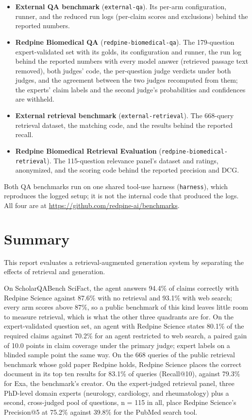 \documentclass[sn-mathphys,Numbered]{sn-jnl}%
\begin{document}
\begin{itemize}[leftmargin=1.6em, itemsep=0.5em]
  \item \textbf{External QA benchmark} (\texttt{external-qa}). Its per-arm configuration,
    runner, and the reduced run logs (per-claim scores and exclusions) behind the reported
    numbers.
  \item \textbf{Redpine Biomedical QA} (\texttt{redpine-biomedical-qa}). The 179-question
    expert-validated set with its golds, its configuration and runner, the run log behind
    the reported numbers with every model answer
    (retrieved passage text removed), both judges' code, the per-question judge verdicts
    under both judges, and the agreement between the two judges recomputed from them; the
    experts' claim labels and the second judge's probabilities and confidences are withheld.
  \item \textbf{External retrieval benchmark} (\texttt{external-retrieval}). The
    668-query retrieval dataset, the matching code, and the results behind the reported
    recall.
  \item {\raggedright\textbf{Redpine Biomedical Retrieval Evaluation}
    (\texttt{redpine-biomedical-retrieval}). The 115-question relevance panel's dataset and
    ratings, anonymized, and the scoring code behind the reported precision and DCG.\par}
\end{itemize}

\noindent Both QA benchmarks run on one shared tool-use harness (\texttt{harness}), which
reproduces the logged setup; it is not the internal code that produced the logs.
All four are at \url{https://github.com/redpine-ai/benchmarks}.

\section{Summary}\label{sec:summary}

This report evaluates a retrieval-augmented generation system by separating the
effects of retrieval and generation.

On ScholarQABench SciFact, the agent answers 94.4\% of claims correctly with Redpine
Science against 87.6\% with no retrieval and 93.1\% with web search; every arm scores
above 87\%, so a public benchmark of this kind leaves little room to measure retrieval,
which is what the other three quadrants are for. On the expert-validated question set,
an agent with Redpine Science states 80.1\% of the required claims against 70.2\% for
an agent restricted to web search, a paired gain of 10.0 points in claim coverage under
the primary judge; expert labels on a blinded sample point the same way. On the 668
queries of the public retrieval benchmark whose gold paper Redpine holds, Redpine
Science places the correct document in its top ten results for 83.1\% of queries
(Recall@10), against 79.3\% for Exa, the benchmark's creator. On the expert-judged
retrieval panel, three PhD-level domain experts (neurology, cardiology, and
rheumatology) plus a second, cross-judged pool of questions, n = 115 in all, place
Redpine Science's Precision@5 at 75.2\% against 39.8\% for the PubMed search tool.
\end{document}
